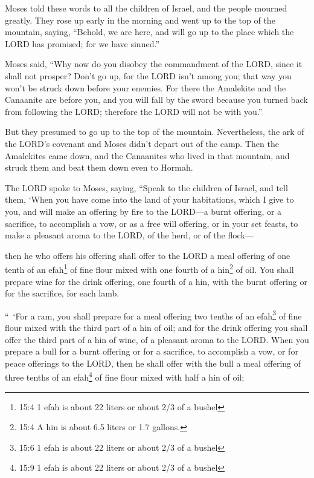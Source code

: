 \myverse{}Moses told these words to all the children of Israel, and the
people mourned greatly.
\myverse{}They rose up early in the morning and went up to the top of the mountain,
saying, “Behold, we are here, and will go up to the place which the LORD has promised; for we have sinned.”


\myverse{}Moses said, “Why now do you disobey the commandment of the LORD,
since it shall not prosper?
\myverse{}Don’t go up, for the LORD isn’t among you; that way you won’t be struck down
before your enemies.
\myverse{}For there the Amalekite and the Canaanite are before you, and you will fall
by the sword because you turned back from following the LORD; therefore the LORD will not be with you.”


\myverse{}But they presumed to go up to the top of the mountain. Nevertheless,
the ark of the LORD’s covenant and Moses didn’t depart out of the camp.
\myverse{}Then the Amalekites came down, and the Canaanites who lived in that mountain,
and struck them and beat them down even to Hormah.


\mychapter{} \myverse*{}The LORD spoke to Moses, saying,
\myverse{}“Speak to the children of Israel, and tell them, ‘When you have come into the
land of your habitations, which I give to you,
\myverse{}and will make an offering by fire to the LORD—a burnt offering, or a sacrifice,
to accomplish a vow, or as a free will offering, or in your set feasts, to make a pleasant aroma to the
LORD, of the herd, or of the flock—

\myverse{}then he who offers his offering shall offer to the LORD a meal offering of
one tenth of an efah\footnote{ 15:4 1 efah is about 22 liters or about 2/3 of a bushel} of fine flour mixed with one fourth
of a hin\footnote{ 15:4 A hin is about 6.5 liters or 1.7 gallons.} of oil.
\myverse{}You shall prepare wine for the drink offering, one fourth of a hin, with the
burnt offering or for the sacrifice, for each lamb.


\myverse{}“ ‘For a ram, you shall prepare for a meal offering two tenths
of an efah\footnote{ 15:6 1 efah is about 22 liters or about 2/3 of a bushel} of fine flour mixed with the third
part of a hin of oil;
\myverse{}and for the drink offering you shall offer the third part of a hin of wine,
of a pleasant aroma to the LORD.
\myverse{}When you prepare a bull for a burnt offering or for a sacrifice, to accomplish
a vow, or for peace offerings to the LORD,
\myverse{}then he shall offer with the bull a meal offering of three tenths of an efah\footnote{ 15:9 1 efah is about 22 liters or about 2/3 of a bushel} of fine flour mixed with half a hin
of oil;

